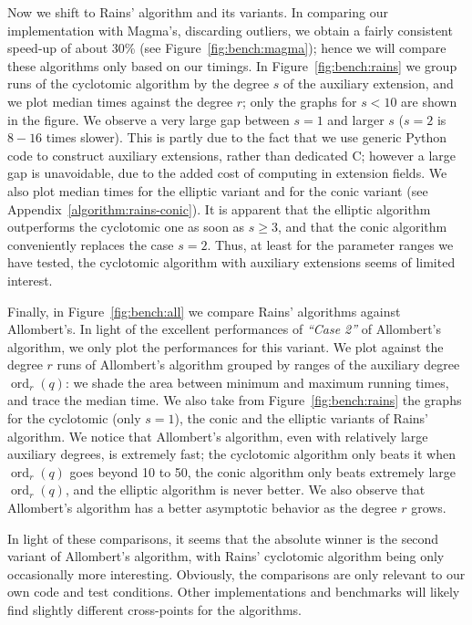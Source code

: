 \documentclass[12pt]{article}
\theoremstyle{plain}
\theoremstyle{definition}
\DeclareMathOperator{\order}{ord} %
\newcounter{algorithm}
\begin{document}
Now we shift to Rains' algorithm and its variants. %
In comparing our implementation with Magma's, discarding outliers, we
obtain a fairly consistent speed-up of about 30\% (see
Figure~\ref{fig:bench:magma}); hence we will compare these algorithms
only based on our timings. %
In Figure~\ref{fig:bench:rains} we group runs of the cyclotomic
algorithm by the degree $s$ of the auxiliary extension, and we plot
median times against the degree $r$; only the graphs for $s<10$ are
shown in the figure. %
We observe a very large gap between $s=1$ and larger $s$
($s=2$ is $8-16$ times slower). This is partly due to the fact that we
use generic Python code to construct auxiliary extensions, rather than
dedicated C; however a large gap is unavoidable, due to the added cost
of computing in extension fields. %
We also plot median times for the elliptic variant and for the conic
variant (see Appendix~\ref{algorithm:rains-conic}). %
It is apparent that the elliptic algorithm outperforms the cyclotomic
one as soon as $s\ge 3$, and that the conic algorithm conveniently
replaces the case $s=2$. %
Thus, at least for the parameter ranges we have tested, the cyclotomic
algorithm with auxiliary extensions seems of limited interest.

Finally, in Figure~\ref{fig:bench:all} we compare Rains' algorithms
against Allombert's. %
In light of the excellent performances of \emph{``Case 2''} of
Allombert's algorithm, we only plot the performances for this
variant. %
We plot against the degree $r$ runs of Allombert's algorithm grouped
by ranges of the auxiliary degree $\order_r(q)$: we shade the area
between minimum and maximum running times, and trace the median
time. %
We also take from Figure~\ref{fig:bench:rains} the graphs for the
cyclotomic (only $s=1$), the conic and the elliptic variants of Rains'
algorithm. %
We notice that Allombert's algorithm, even with relatively large
auxiliary degrees, is extremely fast; the cyclotomic algorithm only
beats it when $\order_r(q)$ goes beyond 10 to 50, the conic algorithm
only beats extremely large $\order_r(q)$, and the elliptic algorithm
is never better. %
We also observe that Allombert's algorithm has a better asymptotic
behavior as the degree $r$ grows.

In light of these comparisons, it seems that the absolute winner is
the second variant of Allombert's algorithm, with Rains' cyclotomic
algorithm being only occasionally more interesting. %
Obviously, the comparisons are only relevant to our own code and
test conditions. Other implementations and benchmarks will likely find
slightly different cross-points for the algorithms.
\end{document}
